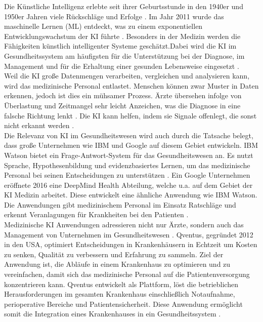Die Künstliche Intelligenz erlebte seit ihrer Geburtsstunde in den 1940er und 1950er Jahren viele Rückschläge und Erfolge \cite{Chapter_14}. Im Jahr 2011 wurde das maschinelle Lernen (ML) entdeckt, was zu einem exponentiellen Entwicklungswachstum der KI führte  \cite{Chapter_14}. Besonders in der Medizin werden die Fähigkeiten künstlich intelligenter Systeme geschätzt.Dabei wird die KI im Gesundheitssystem am häufigsten für die Unterstützung bei der Diagnose, im Management und für die Erhaltung einer gesunden Lebensweise eingesetzt \cite{Opportunities_challenges_ai_hc}.\\
Weil die KI große Datenmengen verarbeiten, vergleichen und analysieren kann, wird das medizinische Personal entlastet. Menschen können zwar Muster in Daten erkennen, jedoch ist dies ein mühsamer Prozess. Ärzte übersehen infolge von Überlastung und Zeitmangel sehr leicht Anzeichen, was die Diagnose in eine falsche Richtung lenkt \cite{Opportunities_challenges_ai_hc}. Die KI kann helfen, indem sie Signale offenlegt, die sonst nicht erkannt werden \cite{Opportunities_challenges_ai_hc}.\\
Die Relevanz von KI im Gesundheitswesen wird auch durch die Tatsache belegt, dass große Unternehmen wie IBM und Google auf diesem Gebiet entwickeln. IBM Watson bietet ein Frage-Antwort-System für das Gesundheitswesen an. Es nutzt Sprache, Hypothesenbildung und evidenzbasiertes Lernen, um das medizinische Personal bei seinen Entscheidungen zu unterstützen \cite{Opportunities_challenges_ai_hc}. Ein Google Unternehmen eröffnete 2016 eine DeepMind Health Abteilung, welche u.a. auf dem Gebiet der KI Medizin arbeitet. Diese entwickelt eine ähnliche Anwendung wie IBM Watson. Die Anwendungen gibt medizinischem Personal im Einsatz Ratschläge und erkennt Veranlagungen für Krankheiten bei den Patienten  \cite{Opportunities_challenges_ai_hc}.\\
Medizinische KI Anwendungen adressieren nicht nur Ärzte, sondern auch das Management von Unternehmen im Gesundheitswesen \cite{Opportunities_challenges_ai_hc}. Qventus, gegründet 2012 in den USA, optimiert Entscheidungen in Krankenhäusern in Echtzeit um Kosten zu senken, Qualität zu verbessern und Erfahrung zu sammeln. Ziel der Anwendung ist, die Abläufe in einem Krankenhaus zu optimieren und zu vereinfachen, damit sich das medizinische Personal auf die Patientenversorgung konzentrieren kann. Qventus entwickelt als Plattform, löst die betrieblichen Herausforderungen im gesamten Krankenhaus einschließlich Notaufnahme, perioperative Bereiche und Patientensicherheit. Diese Anwendung ermöglicht somit die Integration eines Krankenhauses in ein Gesundheitssystem \cite{Opportunities_challenges_ai_hc}.\\
